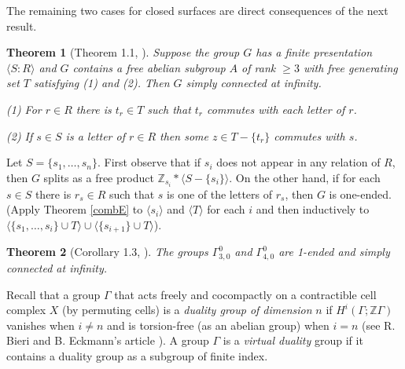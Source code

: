 \documentclass[12pt]{article}
\newtheorem{theorem}{Theorem}[subsection]
\begin{document}
The remaining two cases for closed surfaces are direct consequences of the next result.

\begin{theorem}[Theorem 1.1, \cite{MCG26}] \label{MCGPr} Suppose the group $G$ has a finite presentation $\langle S:R\rangle$ and $G$ contains a free abelian subgroup $A$ of rank $\geq 3$ with free generating set $T$ satisfying (1) and (2). Then $G$ simply connected at infinity.  

\noindent  (1) For $r\in R$ there is $t_r\in T$ such that $t_r$ commutes with each letter of $r$.

\noindent  (2) If $s\in S$ is a letter of $r\in R$ then some $z\in T-\{t_r\}$ commutes with $s$. 
\end{theorem}

Let $S=\{s_1,\ldots, s_n\}$. First observe that if $s_i$ does not appear in any relation of $R$, then $G$ splits as a free product $\mathbb Z_{s_i}\ast \langle S-\{s_i\}\rangle$. On the other hand, if for each $s\in S$ there is $r_s\in R$ such that $s$ is one of the letters of $r_s$, then $G$ is one-ended. (Apply Theorem \ref{combE} to $\langle s_i\rangle$ and $\langle T\rangle$ for each $i$ and then inductively to $\langle \{s_1,\ldots, s_i\}\cup T\rangle \cup \langle \{s_{i+1}\}\cup T\rangle$). 

 \begin{theorem} [Corollary 1.3, \cite{MCG26}] \label{MCGM26}
 The groups $\Gamma_{3,0}^0$ and $\Gamma_{4,0}^0$ are 1-ended and simply connected at infinity.
 \end{theorem}


Recall that a group $\Gamma$ that acts freely and cocompactly on a contractible cell complex
$X$ (by permuting cells) is a {\it duality group of dimension} $n$ if $H^i (\Gamma; \mathbb Z \Gamma)$ vanishes when $i\ne n$ and is torsion-free (as an abelian group) when $i = n$ (see R. Bieri and B. Eckmann's article \cite{BE73}). A group $\Gamma$ is a {\it virtual duality} group if it contains a duality group as a subgroup of finite index.
\end{document}
